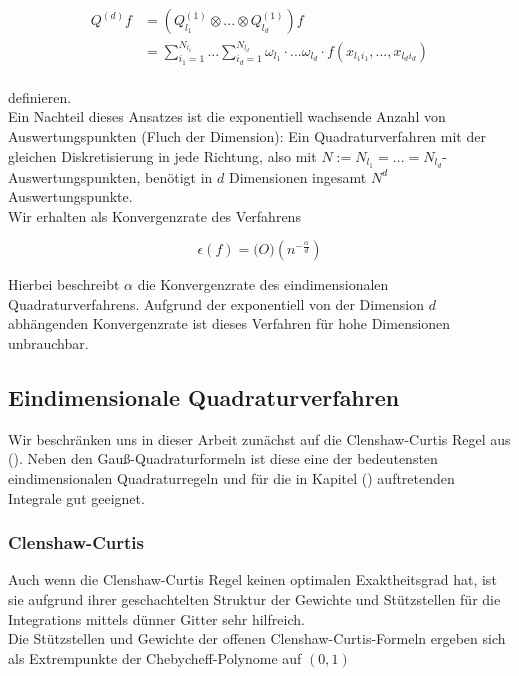 \documentclass[12pt,a4paper]{scrartcl}
\numberwithin{equation}{section}
\begin{document}
{ \begin{equation}
  \begin{split}
  Q^{(d)}f &=(Q_{l_1}^{(1)} \otimes ... \otimes Q_{l_d}^{(1)})f \\
  &= \sum_{i_1 = 1}^{N_{l_1}} ... \sum_{i_d = 1}^{N_{l_d}} \omega_{l_1} \cdot ... \omega_{l_d} \cdot f(x_{l_1 i_1},...,x_{l_d i_d}) \\
  \end{split}
 \end{equation}
 
 definieren. \\
 
 Ein Nachteil dieses Ansatzes ist die exponentiell wachsende Anzahl von Auswertungspunkten (Fluch der Dimension):
 Ein Quadraturverfahren mit der gleichen Diskretisierung in jede Richtung, also mit $N:= N_{l_1} = ... = N_{l_d}$-Auswertungspunkten,
 benötigt in $d$ Dimensionen ingesamt $N^d$ Auswertungspunkte. \\
 
 Wir erhalten als Konvergenzrate des Verfahrens
 
 \begin{equation}
  \epsilon(f) = \mathcal(O)(n^{-\frac{\alpha}{d}})
 \end{equation}
 
 Hierbei beschreibt $\alpha$ die Konvergenzrate des eindimensionalen Quadraturverfahrens.
 Aufgrund der exponentiell von der Dimension $d$ abhängenden Konvergenzrate ist dieses Verfahren
 für hohe Dimensionen unbrauchbar.
 
 \subsection{Eindimensionale Quadraturverfahren}
 
 Wir beschränken uns in dieser Arbeit zunächst auf die Clenshaw-Curtis Regel aus ().
 Neben den Gauß-Quadraturformeln ist diese eine der bedeutensten eindimensionalen Quadraturregeln und
 für die in Kapitel () auftretenden Integrale gut geeignet. 
 
 \subsubsection{Clenshaw-Curtis}
 
 Auch wenn die Clenshaw-Curtis Regel keinen optimalen Exaktheitsgrad hat, ist sie aufgrund ihrer
 geschachtelten Struktur der Gewichte und Stützstellen für die Integrations mittels dünner Gitter 
 sehr hilfreich. \\
 Die Stützstellen und Gewichte der offenen Clenshaw-Curtis-Formeln ergeben sich als Extrempunkte der 
 Chebycheff-Polynome auf $(0,1)$
 
}
\end{document}
